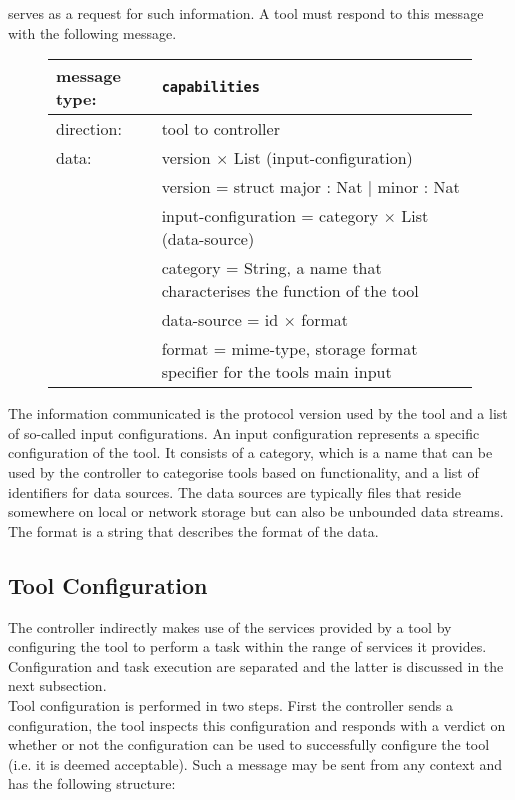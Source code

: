 \documentclass{article}
\newcommand{\msg}[1]{\texttt{#1}}
\begin{document}
   \noindent serves as a request for such information. A tool must respond to
   this message with  the following message.

   \begin{figure}[H]
    \begin{tabular}{|ll|}
     \hline
      message type:   & \msg{capabilities} \\
     \hline
      direction:      & tool to controller \\
      data:           & version $\times$ List (input-configuration) \\
                      &  version             = struct major : Nat $|$ minor : Nat \\
                      &  input-configuration = category $\times$ List (data-source) \\
                      &  category            = String,   a name that characterises the function of the tool \\
                      &  data-source         = id $\times$ format \\
                      &  format              = mime-type, storage format specifier for the tools main input \\
     \hline
    \end{tabular}
   \end{figure}

   The information communicated is the protocol version used by the tool and a
   list of so-called input configurations. An input configuration represents a
   specific configuration of the tool. It consists of a category, which is a
   name that can be used by the controller to categorise tools based on
   functionality, and a list of identifiers for data sources. The data sources
   are typically files that reside somewhere on local or network storage but
   can also be unbounded data streams. The format is a string that describes
   the format of the data.

  \subsection{Tool Configuration}

   The controller indirectly makes use of the services provided by a tool by
   configuring the tool to perform a task within the range of services it
   provides. Configuration and task execution are separated and the latter is
   discussed in the next subsection.
   \\[4pt]
   Tool configuration is performed in two steps. First the controller sends a
   configuration, the tool inspects this configuration and responds with a
   verdict on whether or not the configuration can be used to successfully
   configure the tool (i.e. it is deemed acceptable). Such a message may be
   sent from any context and has the following structure:
   
\end{document}

